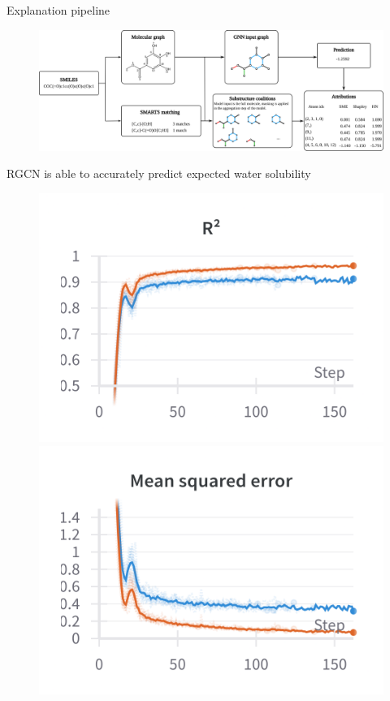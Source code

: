 \documentclass[aspectratio=169]{beamer}
\begin{document}
\begin{frame}{Explanation pipeline}

    \begin{figure}[h]
        \centering
        \includegraphics[scale=0.44]{./img/pipeline.png}
    \end{figure}

\end{frame}


\begin{frame}{RGCN is able to accurately predict expected water solubility}

    \begin{figure}[h]
        \centering
        \includegraphics[scale=0.19]{../thesis/Fig/rgcn_r2_zoomed.png}
        \includegraphics[scale=0.19]{../thesis/Fig/rgcn_mse_zoomed.png}
    \end{figure}
   
\end{frame}
\end{document}
